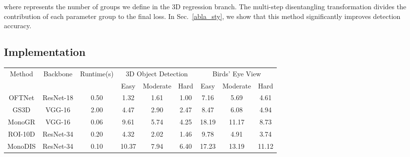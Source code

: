 \documentclass[10pt,twocolumn,letterpaper]{article}
\begin{document}
    where  represents the number of groups we define in the 3D regression branch. The multi-step disentangling transformation divides the contribution of each parameter group to the final loss. In Sec.~\ref{abla_sty}, we show that this method significantly improves detection accuracy.

\subsection{Implementation }
    \begin{table*}[ht]
        \centering
        \begin{tabular}{c||c||c||ccc||ccc}
        \hline
        \multirow{2}{*}{Method} & \multirow{2}{*}{Backbone} & \multirow{2}{*}{Runtime(s)} & \multicolumn{3}{c||}{3D Object Detection}                                   & \multicolumn{3}{c}{Birds' Eye View}                                       \\ \cline{4-9} 
                                &                           &                             & \multicolumn{1}{c}{Easy} & \multicolumn{1}{c}{Moderate} & Hard           & \multicolumn{1}{c}{Easy} & \multicolumn{1}{c}{Moderate} & Hard           \\ \hline
        OFTNet\cite{oft_2019}                & ResNet-18                 & 0.50                        & 1.32                      & 1.61                          & 1.00           & 7.16                      & 5.69                          & 4.61          \\
        GS3D\cite{GS3D_2019}                 & VGG-16                    & 2.00                        & 4.47                      & 2.90                          & 2.47           & 8.47                      & 6.08                          & 4.94           \\
        MonoGR\cite{monogr2019}              & VGG-16                    & 0.06                        & 9.61                      & 5.74                          & 4.25           & 18.19                     & 11.17                         & 8.73          \\
        ROI-10D\cite{roi10d_2019}            & ResNet-34                 & 0.20                        & 4.32                      & 2.02                          & 1.46           & 9.78                      & 4.91                          & 3.74          \\
        MonoDIS\cite{monodis_2019}           & ResNet-34                 & 0.10                        & 10.37                     & 7.94                          & 6.40           & 17.23                     & 13.19                         & 11.12          \\

\end{tabular}
\end{table*}
\end{document}
